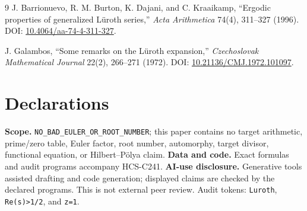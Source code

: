 \documentclass[10pt]{article}
\begin{document}
\begin{thebibliography}{9}
J. Barrionuevo, R. M. Burton, K. Dajani, and C. Kraaikamp, ``Ergodic
properties of generalized L\"uroth series,'' \emph{Acta Arithmetica} 74(4),
311--327 (1996). DOI:
\href{https://doi.org/10.4064/aa-74-4-311-327}{10.4064/aa-74-4-311-327}.

J. Galambos, ``Some remarks on the L\"uroth expansion,''
\emph{Czechoslovak Mathematical Journal} 22(2), 266--271 (1972). DOI:
\href{https://dml.cz/dmlcz/101097}{10.21136/CMJ.1972.101097}.
\end{thebibliography}

\section*{Declarations}
\textbf{Scope.} \nolinkurl{NO_BAD_EULER_OR_ROOT_NUMBER}; this paper contains no
target arithmetic, prime/zero table, Euler factor, root number, automorphy,
target divisor, functional equation, or Hilbert--P\"olya claim.  \textbf{Data
and code.} Exact formulas and audit programs accompany HCS-C241.  \textbf{AI-use
disclosure.} Generative tools assisted drafting and code generation; displayed
claims are checked by the declared programs.  This is not external peer review.
Audit tokens: \texttt{Luroth}, \texttt{Re(s)>1/2}, and \texttt{z=1}.
\end{document}
